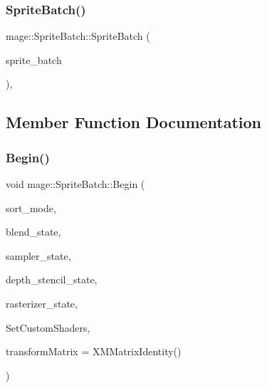 \hypertarget{classmage_1_1_sprite_batch_a270604c9a535cc4fde6e5ff32b58618f}{}\label{classmage_1_1_sprite_batch_a270604c9a535cc4fde6e5ff32b58618f} 
\subsubsection{\texorpdfstring{Sprite\+Batch()}{SpriteBatch()}\hspace{0.1cm}{\footnotesize\ttfamily [3/3]}}
{\footnotesize\ttfamily mage\+::\+Sprite\+Batch\+::\+Sprite\+Batch (\begin{DoxyParamCaption}\item[{\hyperlink{classmage_1_1_sprite_batch}{Sprite\+Batch} \&\&}]{sprite\+\_\+batch }\end{DoxyParamCaption})\hspace{0.3cm}{\ttfamily [private]}, {\ttfamily [delete]}}



\subsection{Member Function Documentation}
\hypertarget{classmage_1_1_sprite_batch_acd323454aa86dfeb598e1c6ab573f68f}{}\label{classmage_1_1_sprite_batch_acd323454aa86dfeb598e1c6ab573f68f} 
\subsubsection{\texorpdfstring{Begin()}{Begin()}}
{\footnotesize\ttfamily void mage\+::\+Sprite\+Batch\+::\+Begin (\begin{DoxyParamCaption}\item[{\hyperlink{namespacemage_a256fa5833eecc408923de7ffadb5e014}{Sprite\+Sort\+Mode}}]{sort\+\_\+mode,  }\item[{I\+D3\+D11\+Blend\+State $\ast$}]{blend\+\_\+state,  }\item[{I\+D3\+D11\+Sampler\+State $\ast$}]{sampler\+\_\+state,  }\item[{I\+D3\+D11\+Depth\+Stencil\+State $\ast$}]{depth\+\_\+stencil\+\_\+state,  }\item[{I\+D3\+D11\+Rasterizer\+State $\ast$}]{rasterizer\+\_\+state,  }\item[{std\+::function$<$ void() $>$}]{Set\+Custom\+Shaders,  }\item[{X\+M\+M\+A\+T\+R\+IX}]{transform\+Matrix = {\ttfamily XMMatrixIdentity()} }\end{DoxyParamCaption})}

